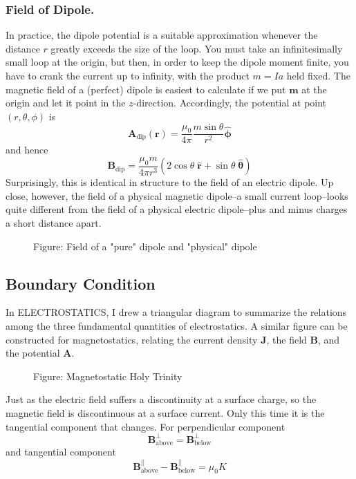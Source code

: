 \documentclass[../../../main.tex]{subfiles}
\begin{document}
\subsubsection*{Field of Dipole.} In practice, the dipole potential is a suitable approximation whenever 
the distance $r$ greatly exceeds the size of the loop. You must take an inﬁnitesimally small loop at the origin, but then, in order to keep the dipole moment ﬁnite, you have to crank the current up to inﬁnity, with the product $m = I a$ held ﬁxed. The magnetic ﬁeld of a (perfect) dipole is easiest to calculate if we put $\mathbf{m}$ at the origin and let it point in the $z$-direction. Accordingly, the potential at point $(r, \theta, \phi)$ is 
\begin{equation*}
    \mathbf{A}_\text{dip}(\mathbf{r})=\frac{\mu_0 }{4\pi  }\frac{m\sin\theta}{r^2}\boldsymbol{\hat{\phi}}
\end{equation*}
and hence
\begin{equation*}
    \mathbf{B}_\text{dip}=\frac{\mu_0 m}{4\pi  r^3}(2\cos \theta \;\mathbf{\hat{r}}+ \sin\theta\;\boldsymbol{\hat{\theta}})
\end{equation*}
Surprisingly, this is identical in structure to the ﬁeld of an electric dipole. Up close, however, the ﬁeld of a physical magnetic dipole--a small current loop--looks quite different from the ﬁeld of a physical electric 
dipole--plus and minus charges a short distance apart.
\begin{figure*}[ht]
    \centering
    \caption*{Figure: Field of a "pure" dipole and "physical" dipole}
\end{figure*}

\subsection*{Boundary Condition}
In ELECTROSTATICS, I drew a triangular diagram to summarize the relations among the three fundamental quantities of electrostatics. A similar ﬁgure can be constructed for magnetostatics, relating the current density \textbf{J}, the ﬁeld \textbf{B}, and the potential \textbf{A}.

\begin{figure*}[ht]
    \centering
    \caption*{Figure: Magnetostatic Holy Trinity}
\end{figure*}

Just as the electric ﬁeld suffers a discontinuity at a surface charge, so the magnetic ﬁeld is discontinuous at a surface current. Only this time it is the tangential component that changes. For perpendicular component
\begin{equation*}
    \mathbf{B}_\text{above}^{\bot}=\mathbf{B}_\text{below}^{\bot}
\end{equation*}
and tangential component
\begin{equation*}
    \mathbf{B}_\text{above}^{||}-\mathbf{B}_\text{below}^{||}=\mu_0K
\end{equation*}
\end{document}
